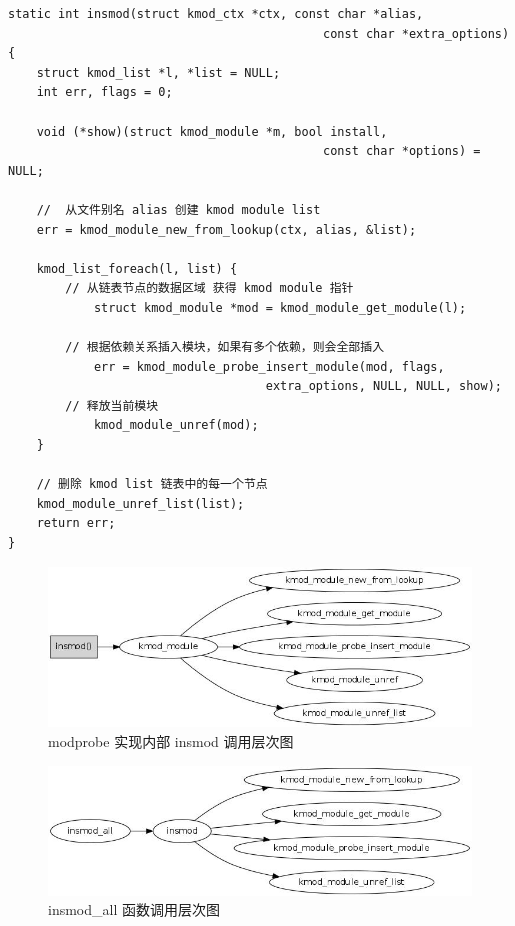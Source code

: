 {\begin{shaded}\begin{verbatim}
static int insmod(struct kmod_ctx *ctx, const char *alias,
                                            const char *extra_options)
{
    struct kmod_list *l, *list = NULL;
    int err, flags = 0;

    void (*show)(struct kmod_module *m, bool install,
                                            const char *options) = NULL;

    //  从文件别名 alias 创建 kmod module list
    err = kmod_module_new_from_lookup(ctx, alias, &list);

    kmod_list_foreach(l, list) {
        // 从链表节点的数据区域 获得 kmod module 指针
            struct kmod_module *mod = kmod_module_get_module(l);

        // 根据依赖关系插入模块，如果有多个依赖，则会全部插入
            err = kmod_module_probe_insert_module(mod, flags,
                                    extra_options, NULL, NULL, show);
        // 释放当前模块
            kmod_module_unref(mod);
    }

    // 删除 kmod list 链表中的每一个节点
    kmod_module_unref_list(list);
    return err;
}
\end{verbatim}\end{shaded}}
\begin{figure}[htbp]
\centering
\includegraphics{./figures/modprobe-insmod.jpg}
\caption{modprobe 实现内部 insmod 调用层次图}
\end{figure}

\begin{figure}[htbp]
\centering
\includegraphics{./figures/insmod_all.jpg}
\caption{insmod\_all 函数调用层次图}
\end{figure}

